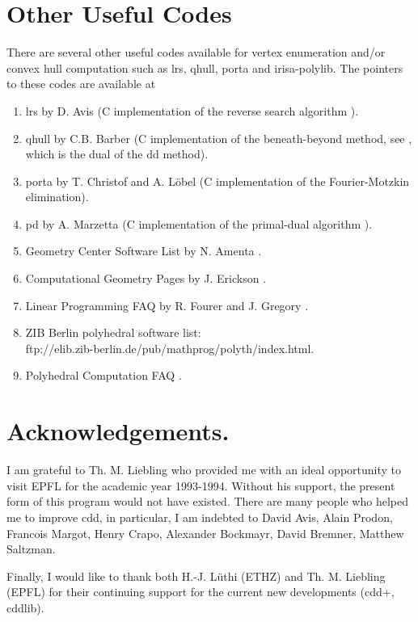 \documentclass[11pt]{article}
\newcommand {\0} {{\bf 0}}
\begin{document}
\section{Other Useful Codes}  \label{CODES}
There are several other useful codes available for vertex enumeration and/or
convex hull computation  such as lrs, qhull, porta and irisa-polylib.
The pointers to these codes are available at
\begin{enumerate}
\item lrs by D. Avis \cite{a-uglrs-97} (C implementation of the reverse search algorithm 
\cite{af-pachv-92}). 

\item qhull by C.B. Barber \cite{bdh-qach-95} (C implementation of
the beneath-beyond method, see \cite{e-acg-87,m-cg-94},
which is the dual of the dd method). 

\item porta by T. Christof and A. L\"obel \cite{cl-porta-97} (C implementation
of the Fourier-Motzkin elimination).

\item pd by A. Marzetta \cite{m-pdcip-97} (C implementation of the primal-dual algorithm 
\cite{bfm-pdmvf-97}). 

 \item Geometry Center Software List by N. Amenta \cite{a-dcg}.

 \item Computational Geometry Pages by J. Erickson \cite{e-cgp}.

 \item Linear Programming FAQ by R. Fourer and J. Gregory \cite{fg-lpfaq-97}.

 \item ZIB Berlin polyhedral software list:\\
{ftp://elib.zib-berlin.de/pub/mathprog/polyth/index.html}.

\item Polyhedral Computation FAQ \cite{f-pcfaq-98}.
\end{enumerate}


\section*{Acknowledgements.} 
I am  grateful to Th. M. Liebling who
provided me with an ideal opportunity to visit EPFL
for the academic year 1993-1994.  Without his 
support, the present form of this program would not have existed.
There are many people who helped me to improve cdd,  in particular,
I am indebted to David Avis, Alain Prodon,  Francois Margot, Henry Crapo,
Alexander Bockmayr, David Bremner, Matthew Saltzman. 

Finally, I would like to thank both H.-J. L\"uthi (ETHZ)
 and Th. M. Liebling (EPFL) for their continuing support for 
the current new developments (cdd+, cddlib).  




\end{document}
